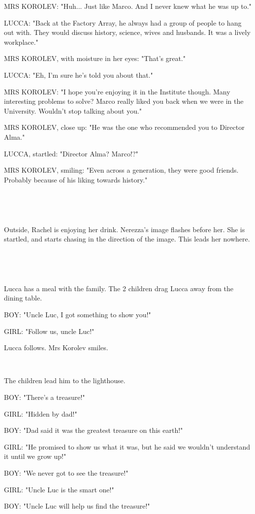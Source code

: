 \documentclass[11pt]{article}
\begin{document}
MRS KOROLEV: "Huh... Just like Marco.
And I never knew what he was up to."

LUCCA: "Back at the Factory Array, he always had a group of people to hang out with.
They would discuss history, science, wives and husbands.
It was a lively workplace."

MRS KOROLEV, with moisture in her eyes: "That's great."

LUCCA: "Eh, I'm sure he's told you about that."

MRS KOROLEV: "I hope you're enjoying it in the Institute though. 
Many interesting problems to solve?
Marco really liked you back when we were in the University.
Wouldn't stop talking about you."

MRS KOROLEV, close up: "He was the one who recommended you to Director Alma."

LUCCA, startled: "Director Alma? Marco!?"

MRS KOROLEV, smiling: "Even across a generation, they were good friends.
Probably because of his liking towards history."

\ 

\ 

Outside, Rachel is enjoying her drink.
Nerezza's image flashes before her.
She is startled, and starts chasing in the direction of the image.
This leads her nowhere.

\ 

\ 

Lucca has a meal with the family. 
The 2 children drag Lucca away from the dining table.

BOY: "Uncle Luc, I got something to show you!"

GIRL: "Follow us, uncle Luc!"

Lucca follows. Mrs Korolev smiles.

\ 

The children lead him to the lighthouse.

BOY: "There's a treasure!"

GIRL: "Hidden by dad!"

BOY: "Dad said it was the greatest treasure on this earth!"

GIRL: "He promised to show us what it was, but he said we wouldn't understand it until we grow up!"

BOY: "We never got to see the treasure!" 

GIRL: "Uncle Luc is the smart one!"

BOY: "Uncle Luc will help us find the treasure!"
\end{document}
